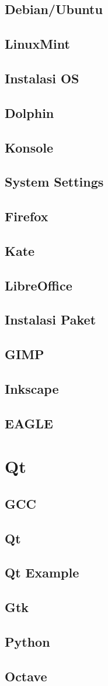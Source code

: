\documentclass[11pt,fleqn]{book} %
\begin{document}
\section{Debian/Ubuntu}
\section{LinuxMint}
\section{Instalasi OS}
\section{Dolphin}
\section{Konsole}
\section{System Settings}
\section{Firefox}
\section{Kate}
\section{LibreOffice}
\section{Instalasi Paket}
\section{GIMP}
\section{Inkscape}
\section{EAGLE}

\newpage
{} %
\chapter{Qt}
\section{GCC}
\section{Qt}
\section{Qt Example}
\section{Gtk}
\section{Python}
\section{Octave}
\end{document}
